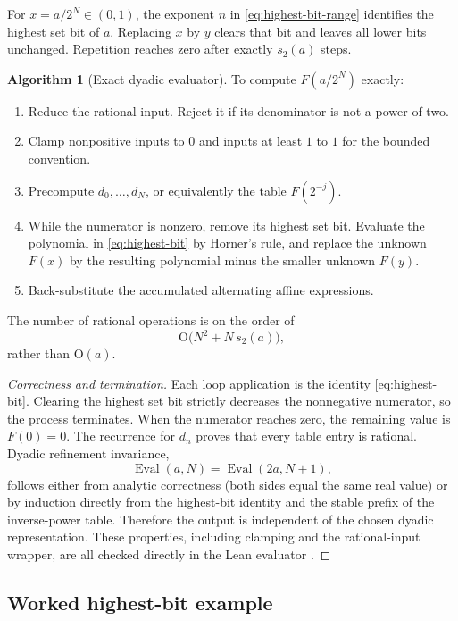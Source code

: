 \documentclass[11pt]{article}
\numberwithin{equation}{section}
\theoremstyle{definition}
\newtheorem{algorithm}[theorem]{Algorithm}
\theoremstyle{remark}
\newcommand{\Oh}{\mathrm O}
\begin{document}
For $x=a/2^N\in(0,1)$, the exponent $n$ in \eqref{eq:highest-bit-range} identifies the highest set bit of $a$.  Replacing $x$ by $y$ clears that bit and leaves all lower bits unchanged.  Repetition reaches zero after exactly $s_2(a)$ steps.

\begin{algorithm}[Exact dyadic evaluator]\label{alg:dyadic-evaluator}
To compute $F(a/2^N)$ exactly:
\begin{enumerate}
\item Reduce the rational input.  Reject it if its denominator is not a power of two.
\item Clamp nonpositive inputs to $0$ and inputs at least $1$ to $1$ for the bounded convention.
\item Precompute $d_0,\ldots,d_N$, or equivalently the table $F(2^{-j})$.
\item While the numerator is nonzero, remove its highest set bit.  Evaluate the polynomial in \eqref{eq:highest-bit} by Horner's rule, and replace the unknown $F(x)$ by the resulting polynomial minus the smaller unknown $F(y)$.
\item Back-substitute the accumulated alternating affine expressions.
\end{enumerate}
The number of rational operations is on the order of
\begin{equation}\label{eq:dyadic-complexity}
 \Oh\bigl(N^2+N\,s_2(a)\bigr),
\end{equation}
rather than $\Oh(a)$.
\end{algorithm}

\begin{proof}[Correctness and termination]
Each loop application is the identity \eqref{eq:highest-bit}.  Clearing the highest set bit strictly decreases the nonnegative numerator, so the process terminates.  When the numerator reaches zero, the remaining value is $F(0)=0$.  The recurrence for $d_n$ proves that every table entry is rational.  Dyadic refinement invariance,
\[
 \operatorname{Eval}(a,N)=\operatorname{Eval}(2a,N+1),
\]
follows either from analytic correctness (both sides equal the same real value) or by induction directly from the highest-bit identity and the stable prefix of the inverse-power table.  Therefore the output is independent of the chosen dyadic representation.  These properties, including clamping and the rational-input wrapper, are all checked directly in the Lean evaluator \cite{ProveIt}.
\end{proof}

\subsection{Worked highest-bit example}
\end{document}
